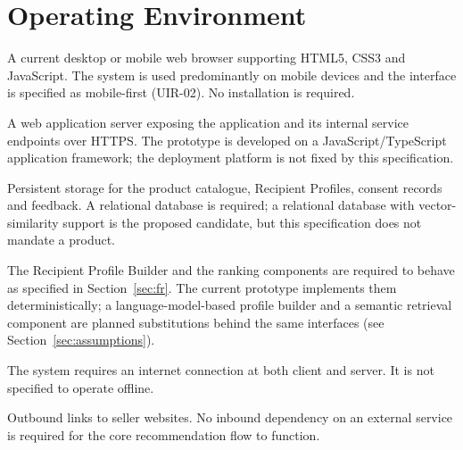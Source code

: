 \documentclass[11pt,a4paper]{report}
\begin{document}
\section{Operating Environment}
\begin{description}[style=nextline,leftmargin=0pt]
  \item[Client] A current desktop or mobile web browser supporting HTML5, CSS3 and
        JavaScript. The system is used predominantly on mobile devices and the interface is
        specified as mobile-first (UIR-02). No installation is required.
  \item[Server] A web application server exposing the application and its internal service
        endpoints over HTTPS. The prototype is developed on a JavaScript/TypeScript
        application framework; the deployment platform is not fixed by this specification.
  \item[Data storage] Persistent storage for the product catalogue, Recipient Profiles,
        consent records and feedback. A relational database is required; a relational
        database with vector-similarity support is the proposed candidate, but this
        specification does not mandate a product.
  \item[Recommendation components] The Recipient Profile Builder and the ranking components
        are required to behave as specified in Section~\ref{sec:fr}. The current prototype
        implements them deterministically; a language-model-based profile builder and a
        semantic retrieval component are planned substitutions behind the same interfaces
        (see Section~\ref{sec:assumptions}).
  \item[Network] The system requires an internet connection at both client and server. It is
        not specified to operate offline.
  \item[External services] Outbound links to seller websites. No inbound dependency on an
        external service is required for the core recommendation flow to function.
\end{description}
\end{document}
